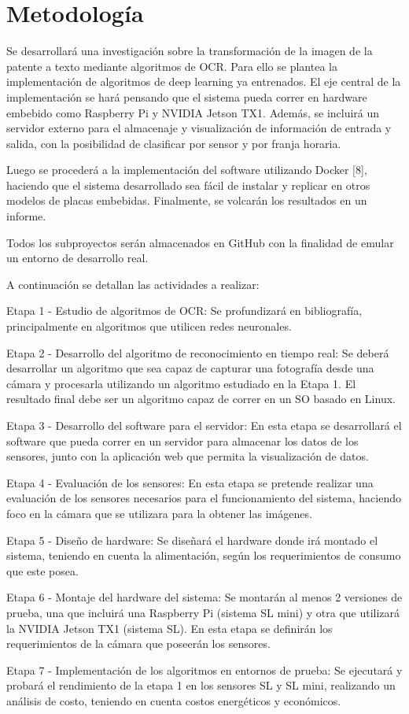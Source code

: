 \section{Metodología}

Se desarrollará una investigación sobre la transformación de la imagen de la patente a texto mediante algoritmos de OCR. Para ello se plantea la implementación de algoritmos de deep learning ya entrenados. El eje central de la implementación se hará pensando que el sistema pueda correr en hardware embebido como Raspberry Pi y NVIDIA Jetson TX1. Además, se incluirá un servidor externo para el almacenaje y visualización de información de entrada y salida, con la posibilidad de clasificar por sensor y por franja horaria.

Luego se procederá a la implementación del software utilizando Docker [8], haciendo que el sistema desarrollado sea fácil de instalar y replicar en otros modelos de placas embebidas.
Finalmente, se volcarán los resultados en un informe.

Todos los subproyectos serán almacenados en GitHub con la finalidad de emular un entorno de desarrollo real.

A continuación se detallan las actividades a realizar:

Etapa 1 - Estudio de algoritmos de OCR: Se profundizará en bibliografía, principalmente en algoritmos que utilicen redes neuronales.

Etapa 2 - Desarrollo del algoritmo de reconocimiento en tiempo real: Se deberá desarrollar un algoritmo que sea capaz de capturar una fotografía desde una cámara y procesarla utilizando un algoritmo estudiado en la Etapa 1. El resultado final debe ser un algoritmo capaz de correr en un SO basado en Linux.

Etapa 3 -  Desarrollo del software para el servidor: En esta etapa se desarrollará el software que pueda correr en un servidor para almacenar los datos de los sensores, junto con la aplicación web que permita la visualización de datos.

Etapa 4 - Evaluación de los sensores: En esta etapa se pretende realizar una evaluación de los sensores necesarios para el funcionamiento del sistema, haciendo foco en la cámara que se utilizara para la obtener las imágenes.

Etapa 5 - Diseño de hardware: Se diseñará el hardware donde irá montado el sistema, teniendo en cuenta la alimentación, según los requerimientos de consumo que este posea.

Etapa 6 - Montaje del hardware del sistema: Se montarán al menos 2 versiones de prueba, una que incluirá una Raspberry Pi (sistema SL mini) y otra que utilizará la NVIDIA Jetson TX1 (sistema SL). En esta etapa se definirán los requerimientos de la cámara que poseerán los sensores.

Etapa 7 - Implementación de los algoritmos en entornos de prueba: Se ejecutará y probará el rendimiento de la etapa 1 en los sensores SL y SL mini, realizando un análisis de costo, teniendo en cuenta costos energéticos y económicos.



